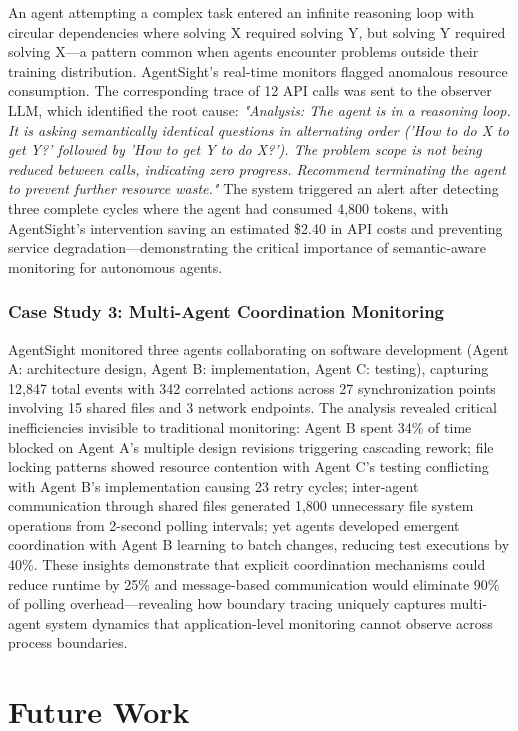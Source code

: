 An agent attempting a complex task entered an infinite reasoning loop with circular dependencies where solving X required solving Y, but solving Y required solving X—a pattern common when agents encounter problems outside their training distribution. AgentSight's real-time monitors flagged anomalous resource consumption. The corresponding trace of 12 API calls was sent to the observer LLM, which identified the root cause: \emph{"Analysis: The agent is in a reasoning loop. It is asking semantically identical questions in alternating order ('How to do X to get Y?' followed by 'How to get Y to do X?'). The problem scope is not being reduced between calls, indicating zero progress. Recommend terminating the agent to prevent further resource waste."} The system triggered an alert after detecting three complete cycles where the agent had consumed 4,800 tokens, with AgentSight's intervention saving an estimated \$2.40 in API costs and preventing service degradation—demonstrating the critical importance of semantic-aware monitoring for autonomous agents.

\subsubsection{Case Study 3: Multi-Agent Coordination Monitoring}

AgentSight monitored three agents collaborating on software development (Agent A: architecture design, Agent B: implementation, Agent C: testing), capturing 12,847 total events with 342 correlated actions across 27 synchronization points involving 15 shared files and 3 network endpoints. The analysis revealed critical inefficiencies invisible to traditional monitoring: Agent B spent 34\% of time blocked on Agent A's multiple design revisions triggering cascading rework; file locking patterns showed resource contention with Agent C's testing conflicting with Agent B's implementation causing 23 retry cycles; inter-agent communication through shared files generated 1,800 unnecessary file system operations from 2-second polling intervals; yet agents developed emergent coordination with Agent B learning to batch changes, reducing test executions by 40\%. These insights demonstrate that explicit coordination mechanisms could reduce runtime by 25\% and message-based communication would eliminate 90\% of polling overhead—revealing how boundary tracing uniquely captures multi-agent system dynamics that application-level monitoring cannot observe across process boundaries.

\section{Future Work}

